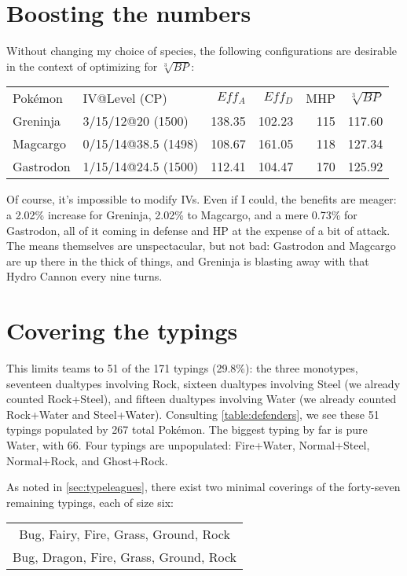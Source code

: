 \section{Boosting the numbers}
Without changing my choice of species, the following configurations are desirable
  in the context of optimizing for $\sqrt[3]{BP}$:
\begin{center}
  \begin{tabular}{llrrrr}
    Pokémon & IV@Level (CP) & $Eff_A$ & $Eff_D$ & MHP & $\sqrt[3]{BP}$\\
    \Midrule
    Greninja & 3/15/12@20 (1500) & 138.35 & 102.23 & 115 & 117.60\\
    Magcargo & 0/15/14@38.5 (1498) & 108.67 & 161.05 & 118 & 127.34\\
    Gastrodon & 1/15/14@24.5 (1500) & 112.41 & 104.47 & 170 & 125.92\\
  \end{tabular}
\end{center}
Of course, it's impossible to modify IVs.
Even if I could, the benefits are meager: a 2.02\% increase for Greninja,
  2.02\% to Magcargo, and a mere 0.73\% for Gastrodon, all of it coming
  in defense and HP at the expense of a bit of attack.
The means themselves are unspectacular, but not bad: Gastrodon and Magcargo are up there
  in the thick of things, and Greninja is blasting away with that Hydro Cannon every nine turns.

\section{Covering the typings}
This limits teams to 51 of the 171 typings (29.8\%): the three monotypes, seventeen dualtypes
 involving Rock, sixteen dualtypes involving Steel (we already counted Rock+Steel), and
 fifteen dualtypes involving Water (we already counted Rock+Water and Steel+Water).
Consulting \autoref{table:defenders}, we see these 51 typings populated by 267 total Pokémon.
The biggest typing by far is pure Water, with 66.
Four typings are unpopulated: Fire+Water, Normal+Steel, Normal+Rock, and Ghost+Rock.

As noted in \autoref{sec:typeleagues}, there exist two minimal coverings of the forty-seven
  remaining typings, each of size six:
\begin{center}
\begin{tabular}{c}
 Bug, Fairy, Fire, Grass, Ground, Rock\\
 Bug, Dragon, Fire, Grass, Ground, Rock\\
\end{tabular}
\end{center}
